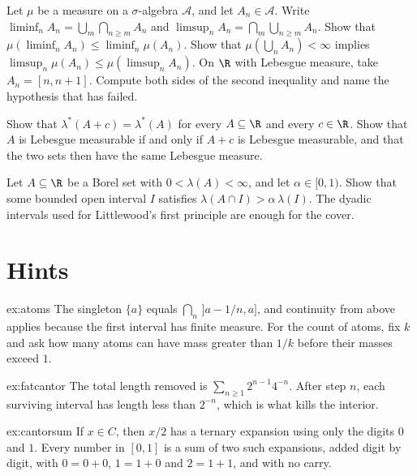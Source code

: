 \begin{exercise}[$\star\star$]\label{ex:v7c07b}
Let $\mu$ be a measure on a $\sigma$-algebra $\mathcal A$, and let $A_n\in\mathcal A$.
Write $\liminf_n A_n=\bigcup_m\bigcap_{n\ge m}A_n$ and $\limsup_n A_n=\bigcap_m\bigcup_{n\ge m}A_n$.
Show that $\mu(\liminf_n A_n)\le\liminf_n\mu(A_n)$.
Show that $\mu(\bigcup_n A_n)<\infty$ implies $\limsup_n\mu(A_n)\le\mu(\limsup_n A_n)$.
On $\R$ with Lebesgue measure, take $A_n=[n,n+1]$.
Compute both sides of the second inequality and name the hypothesis that has failed.
\end{exercise}

\begin{exercise}[$\star\star$]\label{ex:v7c07c}
Show that $\lambda^*(A+c)=\lambda^*(A)$ for every $A\subseteq\R$ and every $c\in\R$.
Show that $A$ is Lebesgue measurable if and only if $A+c$ is Lebesgue measurable, and that the two sets then have the same Lebesgue measure.
\end{exercise}

\begin{exercise}[$\star\star\star$]\label{ex:v7c07d}
Let $A\subseteq\R$ be a Borel set with $0<\lambda(A)<\infty$, and let $\alpha\in[0,1)$.
Show that some bounded open interval $I$ satisfies $\lambda(A\cap I)>\alpha\,\lambda(I)$.
The dyadic intervals used for Littlewood's first principle are enough for the cover.
\end{exercise}

\section{Hints}

\begin{hint}{ex:atoms}
The singleton $\{a\}$ equals $\bigcap_n\,]a-1/n,a]$, and continuity from above applies because the first interval has finite measure.
For the count of atoms, fix $k$ and ask how many atoms can have mass greater than $1/k$ before their masses exceed $1$.
\end{hint}

\begin{hint}{ex:fatcantor}
The total length removed is $\sum_{n\ge1}2^{n-1}4^{-n}$.
After step $n$, each surviving interval has length less than $2^{-n}$, which is what kills the interior.
\end{hint}

\begin{hint}{ex:cantorsum}
If $x\in C$, then $x/2$ has a ternary expansion using only the digits $0$ and $1$.
Every number in $[0,1]$ is a sum of two such expansions, added digit by digit, with $0=0+0$, $1=1+0$ and $2=1+1$, and with no carry.
\end{hint}

